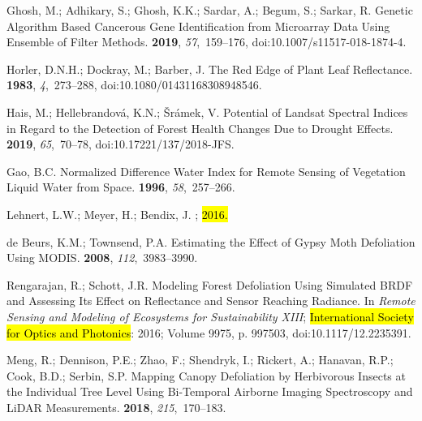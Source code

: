 \documentclass[remotesensing,article,accept,moreauthors,pdftex]{Definitions/mdpi}
\begin{document}
\begin{thebibliography}{999}
Ghosh, M.; Adhikary, S.; Ghosh, K.K.; Sardar, A.; Begum, S.; Sarkar, R.
\newblock Genetic Algorithm Based Cancerous Gene Identification from Microarray
  Data Using Ensemble of Filter Methods.
 {\bf 2019}, {\em
  57},~159--176, doi:10.1007/s11517-018-1874-4.

Horler, D.N.H.; Dockray, M.; Barber, J.
\newblock The Red Edge of Plant Leaf Reflectance.
 {\bf 1983}, {\em
  4},~273--288, doi:10.1080/01431168308948546.

Hais, M.; Hellebrandov{\'a}, K.N.; {\v S}r{\'a}mek, V.
\newblock Potential of {{Landsat}} Spectral Indices in Regard to the Detection
  of Forest Health Changes Due to Drought Effects.
 {\bf 2019}, {\em 65},~70--78, doi:10.17221/137/2018-JFS.

Gao, B.C.
 Normalized Difference Water Index for Remote
  Sensing of Vegetation Liquid Water from Space.
 {\bf 1996}, {\em 58},~257--266.

Lehnert, L.W.; Meyer, H.; Bendix, J.
;  \hl{2016.}

{de Beurs}, K.M.; Townsend, P.A.
\newblock Estimating the Effect of Gypsy Moth Defoliation Using {{MODIS}}.
 {\bf 2008}, {\em
  112},~3983--3990.

Rengarajan, R.; Schott, J.R.
\newblock Modeling Forest Defoliation Using Simulated {{BRDF}} and Assessing
  Its Effect on Reflectance and Sensor Reaching Radiance.
\newblock  In \emph{Remote {{Sensing}} and {{Modeling}} of {{Ecosystems}} for
  {{Sustainability XIII}}}; {\hl{International Society for Optics and Photonics}}:
  2016; Volume 9975, p. 997503, doi:10.1117/12.2235391.

Meng, R.; Dennison, P.E.; Zhao, F.; Shendryk, I.; Rickert, A.; Hanavan, R.P.;
  Cook, B.D.; Serbin, S.P.
\newblock Mapping Canopy Defoliation by Herbivorous Insects at the Individual
  Tree Level Using Bi-Temporal Airborne Imaging Spectroscopy and {{LiDAR}}
  Measurements.
 {\bf 2018}, {\em 215},~170--183.


\end{thebibliography}
\end{document}
